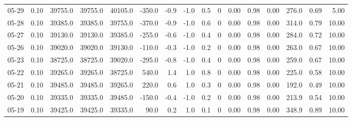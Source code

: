 \begin{threeparttable}
{\begin{tabular}{lrrrrrrrrrrrrrrr}
  05-29 &     0.10 & 39755.0 & 39755.0 & 40105.0 &     -350.0 &           -0.9 &                     -1.0 &                 0.5 &              0 &       0.00 &      0.98 &           0.00 &            276.0 &            0.69 &                   5.00 \\
  05-28 &     0.10 & 39385.0 & 39385.0 & 39755.0 &     -370.0 &           -0.9 &                     -1.0 &                 0.6 &              0 &       0.00 &      0.98 &           0.00 &            314.0 &            0.79 &                  10.00 \\
  05-27 &     0.10 & 39130.0 & 39130.0 & 39385.0 &     -255.0 &           -0.6 &                     -1.0 &                 0.4 &              0 &       0.00 &      0.98 &           0.00 &            284.0 &            0.72 &                  10.00 \\
  05-26 &     0.10 & 39020.0 & 39020.0 & 39130.0 &     -110.0 &           -0.3 &                     -1.0 &                 0.2 &              0 &       0.00 &      0.98 &           0.00 &            263.0 &            0.67 &                  10.00 \\
  05-23 &     0.10 & 38725.0 & 38725.0 & 39020.0 &     -295.0 &           -0.8 &                     -1.0 &                 0.4 &              0 &       0.00 &      0.98 &           0.00 &            259.0 &            0.67 &                  10.00 \\
  05-22 &     0.10 & 39265.0 & 39265.0 & 38725.0 &      540.0 &            1.4 &                      1.0 &                 0.8 &              0 &       0.00 &      0.98 &           0.00 &            225.0 &            0.58 &                  10.00 \\
  05-21 &     0.10 & 39485.0 & 39485.0 & 39265.0 &      220.0 &            0.6 &                      1.0 &                 0.3 &              0 &       0.00 &      0.98 &           0.00 &            192.0 &            0.49 &                  10.00 \\
  05-20 &     0.10 & 39335.0 & 39335.0 & 39485.0 &     -150.0 &           -0.4 &                     -1.0 &                 0.2 &              0 &       0.00 &      0.98 &           0.00 &            213.9 &            0.54 &                  10.00 \\
  05-19 &     0.10 & 39425.0 & 39425.0 & 39335.0 &       90.0 &            0.2 &                      1.0 &                 0.1 &              0 &       0.00 &      0.98 &           0.00 &            348.9 &            0.89 &                  10.00 \\

\end{tabular}}
\end{threeparttable}
